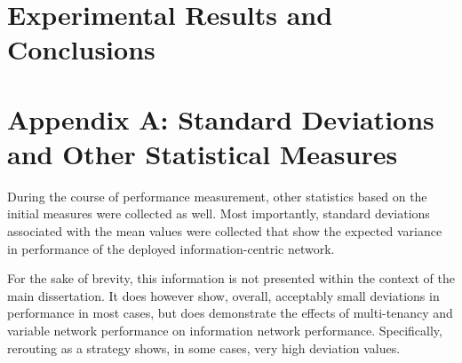 \documentclass[botnum,fleqn,final]{unmeethesis}
\begin{document}
\chapter{Experimental Results and Conclusions}



\chapter*{Appendix A: Standard Deviations and Other Statistical Measures}
\label{chapter:appendix:a}
During the course of performance measurement, other statistics based on the initial measures were collected as well.  Most importantly, standard deviations associated with the mean values were collected that show the expected variance in performance of the deployed information-centric network.

For the sake of brevity, this information is not presented within the context of the main dissertation.  It does however show, overall, acceptably small deviations in performance in most cases, but does demonstrate the effects of multi-tenancy and variable network performance on information network performance.  Specifically, rerouting as a strategy shows, in some cases, very high deviation values.



\pagebreak



\end{document}

